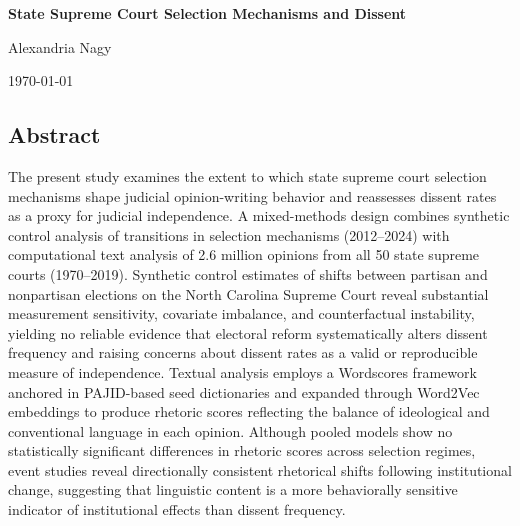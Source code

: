 \begin{titlepage}

    \centering

    \vspace*{\fill}

    {\LARGE\bfseries State Supreme Court Selection Mechanisms and Dissent\par}

    \vspace{1.5cm}

    {\large Alexandria Nagy\par}

    \vspace{0.5cm}

    {\large \today\par}

    \vspace*{\fill}

\end{titlepage}

\newpage

\subsection{Abstract}\label{abstract}

The present study examines the extent to which state supreme court
selection mechanisms shape judicial opinion-writing behavior and
reassesses dissent rates as a proxy for judicial independence. A
mixed-methods design combines synthetic control analysis of transitions
in selection mechanisms (2012--2024) with computational text analysis of
2.6 million opinions from all 50 state supreme courts (1970--2019).
Synthetic control estimates of shifts between partisan and nonpartisan
elections on the North Carolina Supreme Court reveal substantial
measurement sensitivity, covariate imbalance, and counterfactual
instability, yielding no reliable evidence that electoral reform
systematically alters dissent frequency and raising concerns about
dissent rates as a valid or reproducible measure of independence.
Textual analysis employs a Wordscores framework anchored in PAJID-based
seed dictionaries and expanded through Word2Vec embeddings to produce
rhetoric scores reflecting the balance of ideological and conventional
language in each opinion. Although pooled models show no statistically
significant differences in rhetoric scores across selection regimes,
event studies reveal directionally consistent rhetorical shifts
following institutional change, suggesting that linguistic content is a
more behaviorally sensitive indicator of institutional effects than
dissent frequency.

